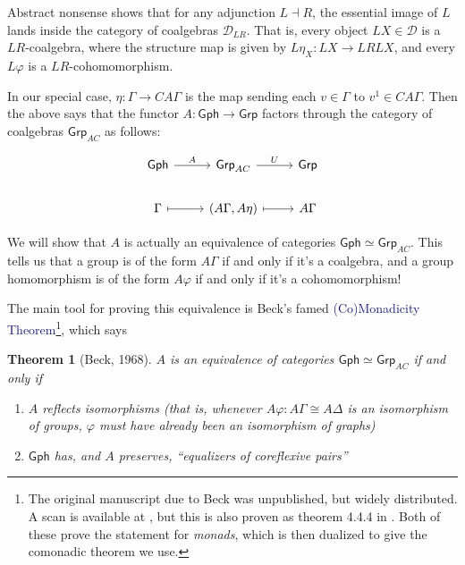 \documentclass[12pt]{article}
\newtheorem{thm}{Theorem}
\theoremstyle{definition}
\theoremstyle{theorem}
\newcommand*{\catFont}[1]{\mathsf{#1}}
\newcommand{\Grp}{\catFont{Grp}}
\newcommand*{\important}[1]{\textcolor{MidnightBlue}{#1}}
\begin{document}
Abstract nonsense shows that for any adjunction $L \dashv R$, the 
essential image of $L$ lands inside the category of coalgebras $\mathcal{D}_{LR}$.
That is, every object $LX \in \mathcal{D}$ is a $LR$-coalgebra, 
where the structure map is given by $L \eta_X : LX \to LRLX$, and every 
$L \varphi$ is a $LR$-cohomomorphism.

In our special case, $\eta : \Gamma \to CA\Gamma$ is the map sending 
each $v \in \Gamma$ to $v^1 \in CA\Gamma$. Then the above says that the 
functor $A : \mathsf{Gph} \to \mathsf{Grp}$ factors through the 
category of coalgebras $\mathsf{Grp}_{AC}$ as follows:

\[\begin{tikzcd}
	{\mathsf{Gph}} & {\mathsf{Grp}_{AC}} & {\mathsf{Grp}} \\
	\Gamma & {(A\Gamma, A \eta)} & A\Gamma
	\arrow[maps to, from=2-1, to=2-2]
	\arrow[maps to, from=2-2, to=2-3]
	\arrow["A", from=1-1, to=1-2]
	\arrow["U", from=1-2, to=1-3]
\end{tikzcd}\]

We will show that $A$ is actually an equivalence of categories 
$\mathsf{Gph} \simeq \Grp_{AC}$. This tells us that a group is of the 
form $A\Gamma$ if and only if it's a coalgebra, and a group homomorphism is 
of the form $A\varphi$ if and only if it's a cohomomorphism!

The main tool for proving this equivalence is Beck's famed
\important{(Co)Monadicity Theorem}\footnote{The original manuscript due to Beck 
was unpublished, but widely distributed. A scan is available at
\cite{beckBeckMonadicityTheorem}, but this is also proven as
theorem 4.4.4 in \cite{borceuxCategoriesStructures1994}. Both of 
these prove the statement for \emph{monads}, which is then dualized to give
the comonadic theorem we use.}, which says

\begin{thm}[Beck, 1968]
    $A$ is an equivalence of categories $\mathsf{Gph} \simeq \Grp_{AC}$ 
    if and only if

    \begin{enumerate}
        \item $A$ reflects isomorphisms (that is, whenever 
          $A \varphi : A\Gamma \cong A\Delta$ is an isomorphism of groups, 
          $\varphi$ must have already been an isomorphism of graphs)
        \item $\mathsf{Gph}$ has, and $A$ preserves, 
          ``equalizers of coreflexive pairs''
    \end{enumerate}
\end{thm}
\end{document}
